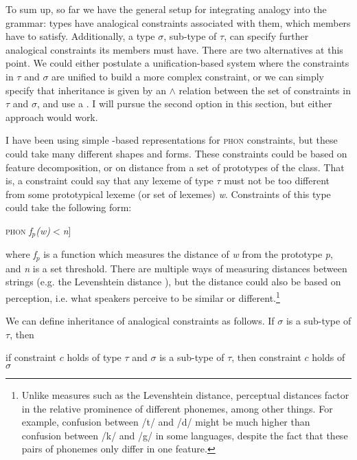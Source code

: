 To sum up, so far we have the general setup for integrating analogy into the grammar: types have analogical constraints associated with them, which members have to satisfy. Additionally, a type $\sigma$, sub-type of $\tau$, can specify further analogical constraints its members must have. There are two alternatives at this point. We could either postulate a unification-based system where the constraints in $\tau$ and $\sigma$ are unified to build a more complex constraint, or we can simply specify that inheritance is given by an $\land$ relation between the set of constraints in $\tau$ and $\sigma$, and use a . I will pursue the second option in this section, but either approach would work.

I have been using simple -based representations for \textsc{phon} constraints, but these could take many different shapes and forms. These constraints could be based on feature decomposition, or on distance from a set of prototypes of the class. That is, a constraint could say that any lexeme of type $\tau$ must not be too different from some prototypical lexeme (or set of lexemes) \textit{w}. Constraints of this type could take the following form:

\begin{exe}
    \ex {[}\textsc{phon} \textit{f$_p$(w)}$<$\textit{n}{]}
\end{exe}

\noindent
where \textit{f$_p$} is a function which measures the distance of \textit{w} from the prototype \textit{p}, and \textit{n} is a set threshold. There are multiple ways of measuring distances between strings (e.g. the Levenshtein distance \citealt{Levenshtein.1966}), but the distance  could also be based on perception, i.e. what speakers perceive to be similar or different.\footnote{Unlike measures such as the Levenshtein distance, perceptual distances factor in the relative prominence of different phonemes, among other things. For example, confusion between /t/ and /d/ might be much higher than confusion between /k/ and /g/ in some languages, despite the fact that these pairs of phonemes only differ in one feature.}

We can define inheritance of analogical constraints as follows. If $\sigma$ is a sub-type of $\tau$, then

\begin{exe}
    \ex if constraint $c$ holds of type $\tau$ and $\sigma$ is a sub-type of $\tau$, then constraint $c$ holds of $\sigma$
\end{exe}

